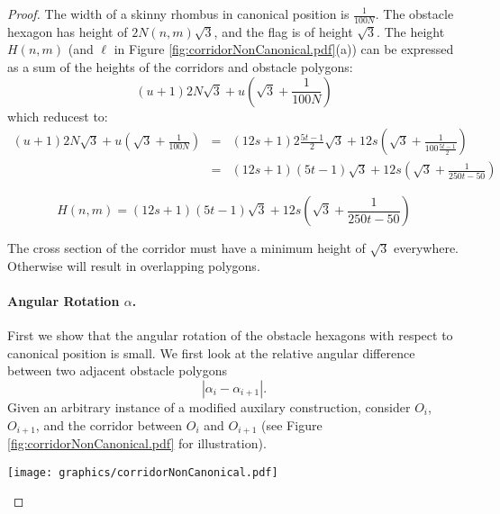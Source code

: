 \documentclass[10pt]{CSUNthesis}
\theoremstyle{plain}%
\theoremstyle{definition}
\theoremstyle{remark}
\newcommand{\lr}[1]{\left( #1 \right)}
\begin{document}
\begin{proof}
The width of a skinny rhombus in canonical position is $\frac{1}{100N}$.
The obstacle hexagon has height of $ 2 N(n,m) \sqrt{3}$, and the flag is of height $\sqrt{3}$. 
The height $H(n,m)$ (and $\ell$ in Figure \ref{fig:corridorNonCanonical.pdf}(a)) can be expressed as a sum of the heights of the corridors and obstacle polygons:
$$(u+1) 2 N \sqrt{3} + u \lr{\sqrt{3}+ \frac{1}{100N}}$$
which reducest to:
\begin{eqnarray*}
(u+1) 2 N  \sqrt{3} + u \lr{\sqrt{3}+ \frac{1}{100N}}&=&(12s+1) 2 \frac{5t-1}{2}  \sqrt{3} + 12s \lr{\sqrt{3}+ \frac{1}{100\frac{5t-1}{2}}}\\
&=&(12s+1)  (5t-1)  \sqrt{3} + 12s \lr{\sqrt{3}+ \frac{1}{250t-50}}
\end{eqnarray*}

\begin{equation}\label{eqn:Hnm}
	H(n,m) = (12s+1)  (5t-1)  \sqrt{3} + 12s \lr{\sqrt{3}+ \frac{1}{250t-50}}
\end{equation}

The cross section of the corridor must have a minimum height of $\sqrt{3}$ everywhere.
Otherwise will result in overlapping polygons.\paragraph{Angular Rotation $\alpha$.}
First we show that the angular rotation of the obstacle hexagons with respect to canonical position is small.  
We first look at the relative angular difference between two adjacent obstacle polygons
$$\left\vert \alpha_i - \alpha_{i+1} \right\vert.$$
Given an arbitrary instance of a modified auxilary construction, consider $O_i$, $O_{i+1}$, and the corridor between $O_i$ and $O_{i+1}$ (see Figure \ref{fig:corridorNonCanonical.pdf} for illustration).

\begin{minipage}{\linewidth}
\begin{center}
\texttt{[image: graphics/corridorNonCanonical.pdf]}
\label{fig:corridorNonCanonical.pdf}
\end{center}
\end{minipage}


\end{proof}
\end{document}
